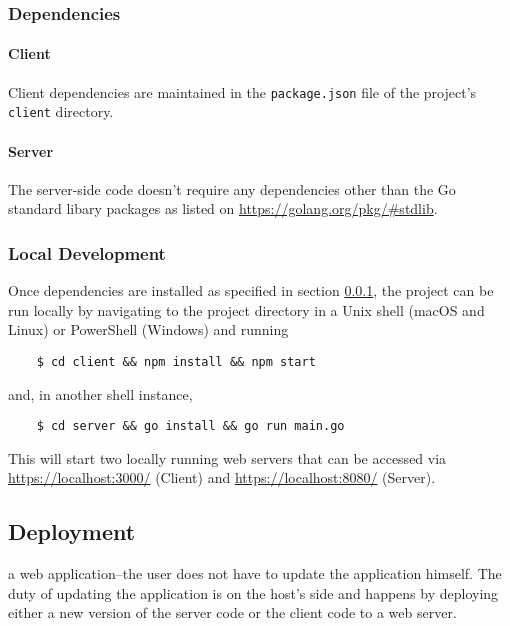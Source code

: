 \subsubsection{Dependencies}
\label{subsub:dependencies}

\paragraph{Client}
Client dependencies are maintained in the \texttt{package.json} file of the project's \texttt{client} directory.
\paragraph{Server}
The server-side code doesn't require any dependencies other than the Go standard libary packages as listed on \url{https://golang.org/pkg/#stdlib}.

\subsubsection{Local Development}
Once dependencies are installed as specified in section \ref{subsub:dependencies}, the project can be run locally by navigating to the project directory in a Unix shell (macOS and Linux) or PowerShell (Windows) and running

\begin{verbatim}
    $ cd client && npm install && npm start
\end{verbatim}
and, in another shell instance,
\begin{verbatim}
    $ cd server && go install && go run main.go
\end{verbatim}

This will start two locally running web servers that can be accessed via \url{https://localhost:3000/} (Client) and \url{https://localhost:8080/} (Server).


\subsection{Deployment}

a web application–the user does not have to update the application himself. 
The duty of updating the application is on the host's side and happens by deploying either a new version of the server code or the client code to a web server.
